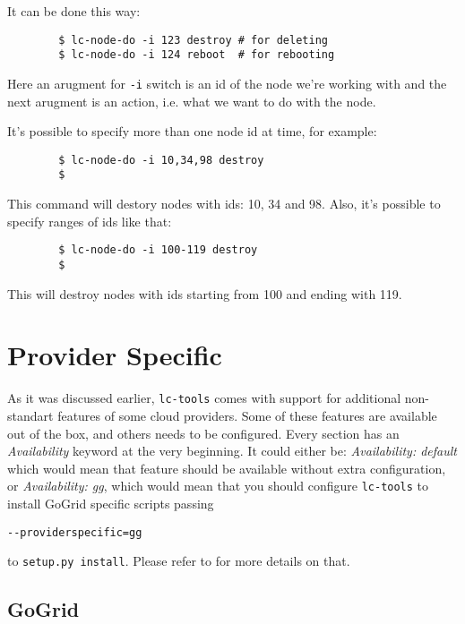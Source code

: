 \documentclass[a4paper]{report}
\begin{document}
       It can be done this way:

       \begin{verbatim}
        $ lc-node-do -i 123 destroy # for deleting
        $ lc-node-do -i 124 reboot  # for rebooting
        \end{verbatim}

       Here an arugment for \texttt{-i} switch is an id of the node we're working
       with and the next arugment is an action, i.e. what we want to do with the node.

       It's possible to specify more than one node id at time, for example:

       \begin{verbatim}
        $ lc-node-do -i 10,34,98 destroy
        $
        \end{verbatim}

       This command will destory nodes with ids: 10, 34 and 98. Also, it's possible to
       specify ranges of ids like that:

       \begin{verbatim}
        $ lc-node-do -i 100-119 destroy
        $
        \end{verbatim}

      This will destroy nodes with ids starting from 100 and ending with 119.

\section{Provider Specific} \label{provspec}

As it was discussed earlier, {\tt lc-tools} comes with support for additional
non-standart features of some cloud providers. Some of these features are available
out of the box, and others needs to be configured. Every section has an
\textit{Availability} keyword at the very beginning. It could either be:
\textit{Availability: default} which would mean that feature should be available 
without extra configuration, or \textit{Availability: gg}, which would mean
that you should configure {\tt lc-tools} to install GoGrid specific scripts passing

\begin{verbatim}
--providerspecific=gg
\end{verbatim}

to \texttt{setup.py install}. Please refer to  for more details on that.

\subsection{GoGrid}
\end{document}
